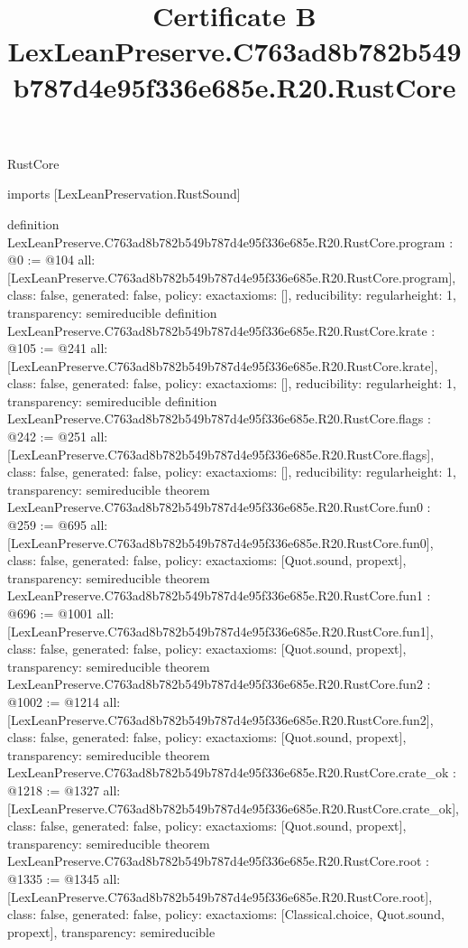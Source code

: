 \begin{lexlean}{RustCore}
\title{Certificate B LexLeanPreserve.C763ad8b782b549b787d4e95f336e685e.R20.RustCore}
\begin{coremodule}
imports [LexLeanPreservation.RustSound]

definition LexLeanPreserve.C763ad8b782b549b787d4e95f336e685e.R20.RustCore.program : @0 := @104 {
  all: [LexLeanPreserve.C763ad8b782b549b787d4e95f336e685e.R20.RustCore.program],
  class: false,
  generated: false,
  policy: exact{axioms: []},
  reducibility: regular{height: 1},
  transparency: semireducible
}
definition LexLeanPreserve.C763ad8b782b549b787d4e95f336e685e.R20.RustCore.krate : @105 := @241 {
  all: [LexLeanPreserve.C763ad8b782b549b787d4e95f336e685e.R20.RustCore.krate],
  class: false,
  generated: false,
  policy: exact{axioms: []},
  reducibility: regular{height: 1},
  transparency: semireducible
}
definition LexLeanPreserve.C763ad8b782b549b787d4e95f336e685e.R20.RustCore.flags : @242 := @251 {
  all: [LexLeanPreserve.C763ad8b782b549b787d4e95f336e685e.R20.RustCore.flags],
  class: false,
  generated: false,
  policy: exact{axioms: []},
  reducibility: regular{height: 1},
  transparency: semireducible
}
theorem LexLeanPreserve.C763ad8b782b549b787d4e95f336e685e.R20.RustCore.fun0 : @259 := @695 {
  all: [LexLeanPreserve.C763ad8b782b549b787d4e95f336e685e.R20.RustCore.fun0],
  class: false,
  generated: false,
  policy: exact{axioms: [Quot.sound, propext]},
  transparency: semireducible
}
theorem LexLeanPreserve.C763ad8b782b549b787d4e95f336e685e.R20.RustCore.fun1 : @696 := @1001 {
  all: [LexLeanPreserve.C763ad8b782b549b787d4e95f336e685e.R20.RustCore.fun1],
  class: false,
  generated: false,
  policy: exact{axioms: [Quot.sound, propext]},
  transparency: semireducible
}
theorem LexLeanPreserve.C763ad8b782b549b787d4e95f336e685e.R20.RustCore.fun2 : @1002 := @1214 {
  all: [LexLeanPreserve.C763ad8b782b549b787d4e95f336e685e.R20.RustCore.fun2],
  class: false,
  generated: false,
  policy: exact{axioms: [Quot.sound, propext]},
  transparency: semireducible
}
theorem LexLeanPreserve.C763ad8b782b549b787d4e95f336e685e.R20.RustCore.crate_ok : @1218 := @1327 {
  all: [LexLeanPreserve.C763ad8b782b549b787d4e95f336e685e.R20.RustCore.crate_ok],
  class: false,
  generated: false,
  policy: exact{axioms: [Quot.sound, propext]},
  transparency: semireducible
}
theorem LexLeanPreserve.C763ad8b782b549b787d4e95f336e685e.R20.RustCore.root : @1335 := @1345 {
  all: [LexLeanPreserve.C763ad8b782b549b787d4e95f336e685e.R20.RustCore.root],
  class: false,
  generated: false,
  policy: exact{axioms: [Classical.choice, Quot.sound, propext]},
  transparency: semireducible
}


\end{coremodule}
\end{lexlean}
